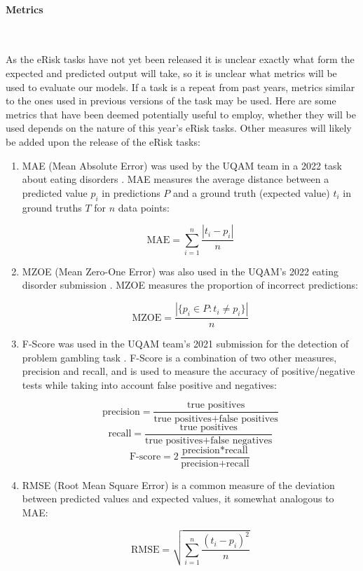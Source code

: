 \documentclass[12pt, titlepage]{article}
\newcommand{\myparagraph}[1]{\paragraph{#1}\mbox{}\\}
\begin{document}
\myparagraph{Metrics} \label{metrics}

As the eRisk tasks have not yet been released it is unclear exactly what form the expected and predicted output will take, so it is unclear what metrics will be used to evaluate our models. If a task is a repeat from past years, metrics similar to the ones used in previous versions of the task may be used. Here are some metrics that have been deemed potentially useful to employ, whether they will be used depends on the nature of this year's eRisk tasks. Other measures will likely be added upon the release of the eRisk tasks:

\begin{enumerate}

\item{MAE} (Mean Absolute Error) was used by the UQAM team in a 2022 task about eating disorders \citep{Saravani2022MeasuringTS}. MAE measures the average distance between a predicted value $p_i$ in predictions $P$ and a ground truth (expected value) $t_i$ in ground truths $T$ for $n$ data points:

$$\text{MAE} = \sum_{i=1}^{n} \frac{|t_i - p_i|}{n}$$

\item{MZOE} (Mean Zero-One Error) was also used in the UQAM's 2022 eating disorder submission \citep{Saravani2022MeasuringTS}. MZOE measures the proportion of incorrect predictions:

$$\text{MZOE} = \frac{|\{p_i \in P : t_i \neq p_i\}|}{n}$$

\item{F-Score} was used in the UQAM team's 2021 submission for the detection of problem gambling task \citep{Maupom2021EarlyDO}. F-Score is a combination of two other measures, precision and recall, and is used to measure the accuracy of positive/negative tests while taking into account false positive and negatives:

$$\text{precision} = \frac{\text{true positives}}{\text{true positives} + \text{false positives}}$$
$$\text{recall} = \frac{\text{true positives}}{\text{true positives} + \text{false negatives}}$$
$$\text{F-score} = 2\frac{\text{precision} * \text{recall}}{\text{precision} + \text{recall}}$$

\item{RMSE} (Root Mean Square Error) is a common measure of the deviation between predicted values and expected values, it somewhat analogous to MAE:

$$\text{RMSE} = \sqrt{\sum_{i=1}^{n} \frac{(t_i - p_i)^2}{n}}$$


\end{enumerate}
\end{document}
